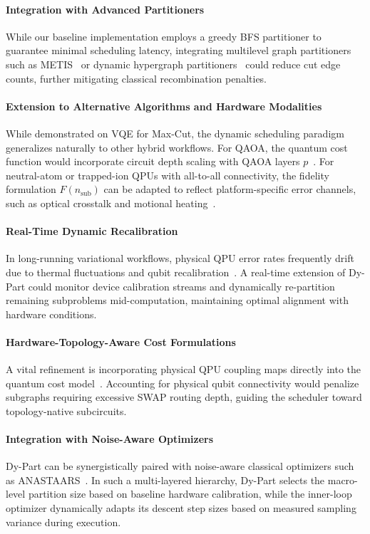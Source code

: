 \documentclass[pdflatex,sn-mathphys-num]{sn-jnl}
\theoremstyle{thmstyleone}
\theoremstyle{thmstyletwo}%
\theoremstyle{thmstylethree}%
\begin{document}
\paragraph{Integration with Advanced Partitioners} While our baseline implementation employs a greedy BFS partitioner to guarantee minimal scheduling latency, integrating multilevel graph partitioners such as METIS~\cite{Karypis1998} or dynamic hypergraph partitioners~\cite{Sweeney2025DynamicHPAH} could reduce cut edge counts, further mitigating classical recombination penalties.

\paragraph{Extension to Alternative Algorithms and Hardware Modalities} While demonstrated on VQE for Max-Cut, the dynamic scheduling paradigm generalizes naturally to other hybrid workflows. For QAOA, the quantum cost function would incorporate circuit depth scaling with QAOA layers $p$~\cite{Farhi2014QuantumAO}. For neutral-atom or trapped-ion QPUs with all-to-all connectivity, the fidelity formulation $F(n_{\text{sub}})$ can be adapted to reflect platform-specific error channels, such as optical crosstalk and motional heating~\cite{Henriet2020QuantumCWJ, Dalyac2024GraphAWAC, Kashif2024ComputationalAIAT}.

\paragraph{Real-Time Dynamic Recalibration} In long-running variational workflows, physical QPU error rates frequently drift due to thermal fluctuations and qubit recalibration~\cite{Lubinski2022AdvancingHQA}. A real-time extension of Dy-Part could monitor device calibration streams and dynamically re-partition remaining subproblems mid-computation, maintaining optimal alignment with hardware conditions.

\paragraph{Hardware-Topology-Aware Cost Formulations} A vital refinement is incorporating physical QPU coupling maps directly into the quantum cost model~\cite{Xu2025GPUAcceleratedDQF}. Accounting for physical qubit connectivity would penalize subgraphs requiring excessive SWAP routing depth, guiding the scheduler toward topology-native subcircuits.

\paragraph{Integration with Noise-Aware Optimizers} Dy-Part can be synergistically paired with noise-aware classical optimizers such as ANASTAARS~\cite{dzahini2025noise}. In such a multi-layered hierarchy, Dy-Part selects the macro-level partition size based on baseline hardware calibration, while the inner-loop optimizer dynamically adapts its descent step sizes based on measured sampling variance during execution.
\end{document}
